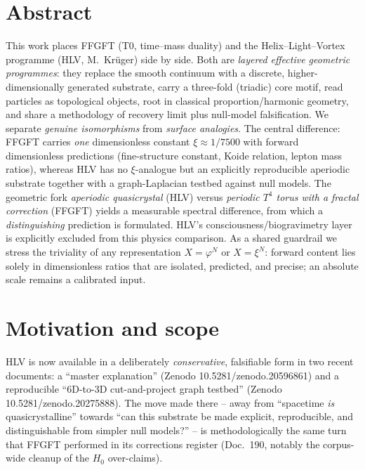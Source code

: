 
\section*{Abstract}
This work places FFGFT (T0, time--mass duality) and the Helix--Light--Vortex programme
(HLV, M.~Krüger) side by side. Both are \emph{layered effective geometric programmes}: they
replace the smooth continuum with a discrete, higher-dimensionally generated substrate, carry a
three-fold (triadic) core motif, read particles as topological objects, root in classical
proportion/harmonic geometry, and share a methodology of recovery limit plus null-model
falsification. We separate \emph{genuine isomorphisms} from \emph{surface analogies}. The central
difference: FFGFT carries \emph{one} dimensionless constant $\xi \approx 1/7500$ with forward
dimensionless predictions (fine-structure constant, Koide relation, lepton mass ratios), whereas
HLV has no $\xi$-analogue but an explicitly reproducible aperiodic substrate together with a
graph-Laplacian testbed against null models. The geometric fork \emph{aperiodic quasicrystal} (HLV)
versus \emph{periodic $T^4$ torus with a fractal correction} (FFGFT) yields a measurable spectral
difference, from which a \emph{distinguishing} prediction is formulated. HLV's
consciousness/biogravimetry layer is explicitly excluded from this physics comparison. As a shared
guardrail we stress the triviality of any representation $X=\varphi^{N}$ or $X=\xi^{N}$: forward
content lies solely in dimensionless ratios that are isolated, predicted, and precise; an absolute
scale remains a calibrated input.

\section{Motivation and scope}

HLV is now available in a deliberately \emph{conservative}, falsifiable form in two recent
documents: a \enquote{master explanation} (Zenodo 10.5281/zenodo.20596861) and a reproducible
\enquote{6D-to-3D cut-and-project graph testbed} (Zenodo 10.5281/zenodo.20275888). The move made
there -- away from \enquote{spacetime \emph{is} quasicrystalline} towards \enquote{can this
substrate be made explicit, reproducible, and distinguishable from simpler null models?} -- is
methodologically the same turn that FFGFT performed in its corrections register (Doc.~190, notably
the corpus-wide cleanup of the $H_0$ over-claims).

